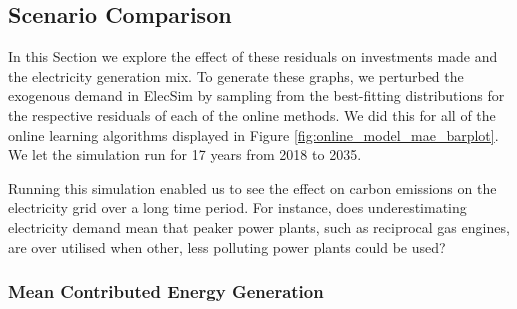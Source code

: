 \subsection{Scenario Comparison}

In this Section we explore the effect of these residuals on investments made and the electricity generation mix.  To generate these graphs, we perturbed the exogenous demand in ElecSim by sampling from the best-fitting distributions for the respective residuals of each of the online methods. We did this for all of the online learning algorithms displayed in Figure \ref{fig:online_model_mae_barplot}. We let the simulation run for 17 years from 2018 to 2035. 

Running this simulation enabled us to see the effect on carbon emissions on the electricity grid over a long time period. For instance, does underestimating electricity demand mean that peaker power plants, such as reciprocal gas engines, are over utilised when other, less polluting power plants could be used?



\subsubsection{Mean Contributed Energy Generation}


